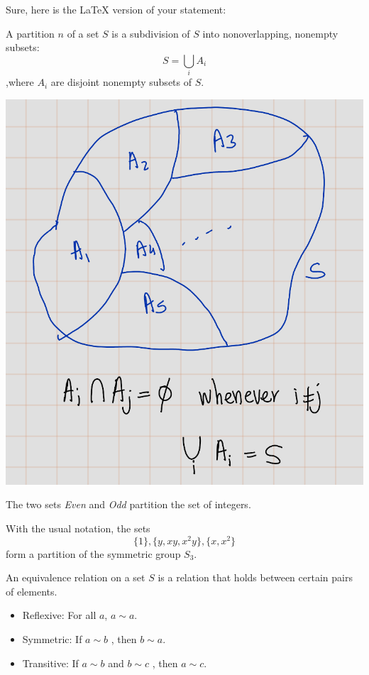 \documentclass[
]{book}
\providecommand{\tightlist}{%
  \setlength{\itemsep}{0pt}\setlength{\parskip}{0pt}}
\begin{document}
\leavevmode{}%
Sure, here is the LaTeX version of your statement:

A partition \(n\) of a set \(S\) is a subdivision of \(S\) into
nonoverlapping, nonempty subsets: \[S = \bigcup_{i} A_i\] ,where \(A_i\)
are disjoint nonempty subsets of \(S\).

\includegraphics{figures/ch_2/fig32.png}

\leavevmode{}%
The two sets \emph{Even} and \emph{Odd} partition the set of integers.

\leavevmode{}%
With the usual notation, the sets \[\{1\}, \{y, xy, x^2y\}, \{x, x^2\}\]
form a partition of the symmetric group \(S_3\).

\leavevmode{}%
An equivalence relation on a set \(S\) is a relation that holds between
certain pairs of elements.

\begin{itemize}
\tightlist
\item
  Reflexive: For all \(a\), \(a \sim a\).
\item
  Symmetric: If \(a \sim b\) , then \(b \sim a\).
\item
  Transitive: If \(a \sim b\) and \(b \sim c\) , then \(a \sim c\).
\end{itemize}
\end{document}
